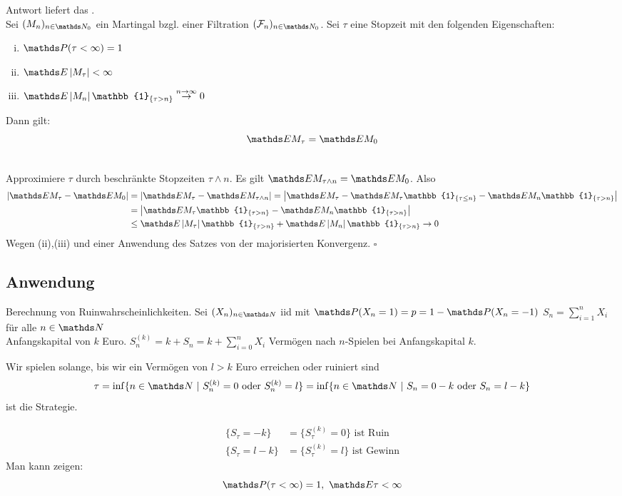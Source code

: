 Antwort liefert das .\\
Sei $(M_n)_{n\in \N_0}$ ein Martingal bzgl. einer Filtration $(\F_n)_{n\in \N_0}$. 
Sei $\tau$ eine Stopzeit mit den folgenden Eigenschaften:
\begin{enumerate}[(i)]
	\item $\Pw(\tau<\infty)=1$
	\item $\E\abs{M_\tau}<\infty$
	\item $\E\abs{M_n}\mathbb{1}_{\{\tau>n\}} \stackrel{n\to\infty}{\to}0$
\end{enumerate}
Dann gilt: 
\[
\E M_\tau=\E M_0 
\]

\\
Approximiere $\tau$ durch beschränkte Stopzeiten $\tau\land n$. 
Es gilt $\E M_{\tau\land n} =\E M_0$. 
Also 
\begin{equation*}
\begin{aligned}
	\abs{\E M_\tau-\E M_0}&=\abs{\E M_\tau-\E M_{\tau\land n}} =\abs{\E M_\tau-\E M_\tau\mathbb{1}_{\{\tau\le n\}}-\E M_n\mathbb{1}_{\{\tau> n\}}}\\
	&= \abs{\E M_\tau\mathbb{1}_{\{\tau> n\}}- \E M_n\mathbb{1}_{\{\tau >n\}}}\\
	&\le \E\abs{M_\tau}\mathbb{1}_{\{\tau> n\}}+ \E\abs{M_n}\mathbb{1}_{\{\tau>n\}} \to 0
\end{aligned}
\end{equation*}
Wegen (ii),(iii) und einer Anwendung des Satzes von der majorisierten Konvergenz.
\hfill $\square$



\subsection{Anwendung}

Berechnung von Ruinwahrscheinlichkeiten. Sei $(X_n)_{n\in \N}$ iid mit $\Pw(X_n=1)=p=1-\Pw(X_n=-1)$ $S_n=\sum_{i=1}^{n} X_i$ für alle $n\in \N$\\
Anfangskapital von $k$ Euro. $S_n^{(k)}=k+S_n=k+\sum_{i=0}^{n} X_i$ Vermögen nach $n$-Spielen bei Anfangskapital $k$.

Wir spielen solange, bis wir ein Vermögen von $l>k$ Euro erreichen oder ruiniert sind 
\[
\tau=\inf\{n\in \N~|~S_n^{(k)}=0\text{ oder } S_n^{(k)}=l \} = \inf\{n\in \N~|~S_n=0-k\text{ oder } S_n=l-k \}
\]
ist die Strategie.

\begin{equation*}
\begin{aligned}
	\{S_\tau=-k\} &= \{S_\tau^{(k)}=0\} \text{ ist Ruin}\\
	\{S_\tau=l-k\} &= \{S_\tau^{(k)}=l\} \text{ ist Gewinn}
\end{aligned}
\end{equation*}
Man kann zeigen: 
\[
\Pw(\tau<\infty)=1,~\E \tau<\infty 
\]

